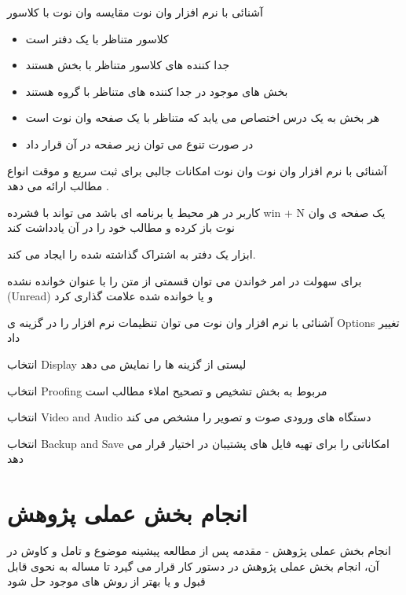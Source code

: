 \documentclass[14pt]{beamer}
\makeatletter
\newcommand{\rtlist}{\raggedleft\rightskip\@totalleftmargin}
\newcommand{\sectionfontsize}{\fontsize{22pt}{0pt}\selectfont}
\newcommand{\framefontsizelarge}{\fontsize{18pt}{0pt}\selectfont}
\newcommand{\frametitlefontsize}{\fontsize{20pt}{0pt}\selectfont}
\makeatother
\begin{document}
\begin{persian}
\begin{frame}{\frametitlefontsize  آشنائی با نرم افزار وان نوت }
		مقایسه وان نوت با کلاسور 
		\begin{itemize}\rtlist
			\item کلاسور متناظر با یک دفتر است 
			\item جدا کننده های کلاسور متناظر با بخش هستند 
			\item بخش های موجود در جدا کننده های متناظر با گروه هستند 
			\item هر بخش به یک درس اختصاص می یابد که متناظر با یک صفحه وان نوت است 
			\item  در صورت تنوع می توان زیر صفحه در آن قرار داد 
		\end{itemize}
	\end{frame}
	
	\begin{frame}{\frametitlefontsize  آشنائی با نرم افزار وان نوت }
		\framefontsizelarge
		وان نوت امکانات جالبی برای ثبت سریع و موقت انواع مطالب ارائه می دهد .
		
		 کاربر در هر محیط یا برنامه ای باشد می تواند با فشرده win + N یک صفحه ی وان نوت باز کرده و مطالب خود را در آن یادداشت کند 
		 
		 ابزار  یک دفتر به اشتراک گذاشته شده را ایجاد می کند.
		 
		 برای سهولت در امر خواندن می توان قسمتی از متن را با عنوان خوانده نشده (Unread) و یا خوانده شده علامت گذاری کرد  
	\end{frame}
	
	\begin{frame}{\frametitlefontsize  آشنائی با نرم افزار وان نوت }
		\framefontsizelarge
		می توان تنظیمات نرم افزار را در گزینه ی Options تغییر داد 
		
		انتخاب Display لیستی از گزینه ها را نمایش می دهد 
		
		انتخاب Proofing مربوط به بخش تشخیص و تصحیح املاء مطالب است 
		
		انتخاب Video and Audio دستگاه های ورودی صوت و تصویر را مشخص می کند 
		
		انتخاب Backup and Save امکاناتی را برای تهیه فایل های پشتیبان در اختیار قرار می دهد  
	\end{frame}
	
	\section{\sectionfontsize انجام بخش عملی پژوهش}	

	\begin{frame}{\frametitlefontsize  انجام بخش عملی پژوهش - مقدمه }
		\framefontsizelarge
		پس از مطالعه پیشینه موضوع و تامل و کاوش در آن، انجام بخش عملی پژوهش در دستور کار قرار می گیرد تا مساله به نحوی قابل قبول و یا بهتر از روش های موجود حل شود
	\end{frame}
	

\end{persian}
\end{document}
